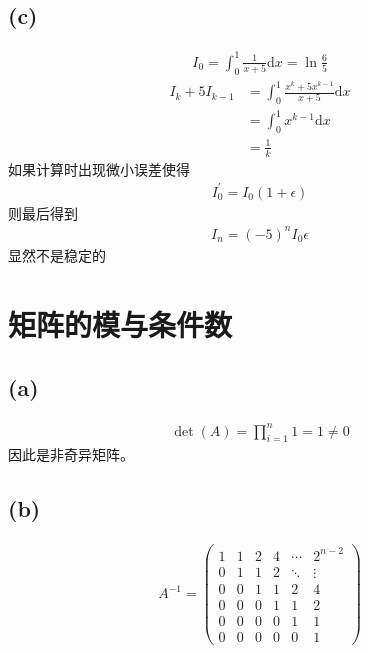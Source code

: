\documentclass{article}
\numberwithin{equation}{section}
\begin{document}
\subsection*{(c)}
\begin{align}
    I_0=\int_0^1 \frac{1}{x+5}\mathrm{d}x=\ln \frac{6}{5}
\end{align}
\begin{align}
    I_k+5I_{k-1} & =\int_0^1 \frac{x^k+5x^{k-1}}{x+5}\mathrm{d}x \\
                 & =\int_0^1 x^{k-1}\mathrm{d}x                  \\
                 & =\frac{1}{k}
\end{align}
如果计算时出现微小误差使得
\begin{align}
    I_0^{\prime}=I_0\left(1+\epsilon\right)
\end{align}
则最后得到
\begin{align}
    I_n=\left(-5\right)^n I_0 \epsilon
\end{align}
显然不是稳定的
\section{矩阵的模与条件数}
\subsection*{(a)}
\begin{align}
    \det\left(A\right)=\prod_{i=1}^n 1=1 \neq 0
\end{align}
因此是非奇异矩阵。
\subsection*{(b)}
\begin{align}
    A^{-1}=\begin{pmatrix}
        1 & 1 & 2 & 4 & \cdots & 2^{n-2} \\
        0 & 1 & 1 & 2 & \ddots & \vdots  \\
        0 & 0 & 1 & 1 & 2      & 4       \\
        0 & 0 & 0 & 1 & 1      & 2       \\
        0 & 0 & 0 & 0 & 1      & 1       \\
        0 & 0 & 0 & 0 & 0      & 1
    \end{pmatrix}
\end{align}
\end{document}
